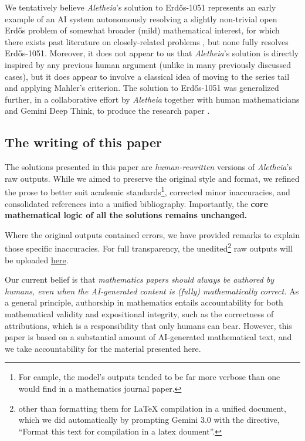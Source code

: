 \documentclass{article}
\theoremstyle{plain}
\theoremstyle{definition}
\newcommand{\Aletheia}{\emph{Aletheia}}
\begin{document}
We tentatively believe {\Aletheia}'s solution to Erd\H{o}s-1051 represents an early example of an AI system autonomously resolving a slightly non-trivial open Erd\H{o}s problem of somewhat broader (mild)  mathematical interest, for which there exists past literature on closely-related problems \cite{KolouchNovotny2016DiophantineApproximations}, but none fully resolves Erd\H{o}s-1051. Moreover, it does not appear to us that {\Aletheia}'s solution is directly inspired by any previous human argument (unlike in many previously discussed cases), but it does appear to involve a classical idea of moving to the series tail and applying Mahler's criterion. The solution to Erd\H{o}s-1051 was generalized further, in a collaborative effort by {\Aletheia} together with human mathematicians and Gemini Deep Think, to produce the research paper \cite{BKKKZ}. 


\subsection{The writing of this paper} The solutions presented in this paper are \emph{human-rewritten} versions of \Aletheia’s raw outputs. While we aimed to preserve the original style and format, we refined the prose to better suit academic standards\footnote{For eample, the model's outputs tended to be far more verbose than one would find in a mathematics journal paper.}, corrected minor inaccuracies, and consolidated references into a unified bibliography. Importantly, the \textbf{core mathematical logic of all the solutions remains unchanged.} 

Where the original outputs contained errors, we have provided remarks to explain those specific inaccuracies. For full transparency, the unedited\footnote{other than formatting them for {\LaTeX} compilation in a unified document, which we did automatically by prompting Gemini 3.0 with the directive, ``Format this text for compilation in a latex doument''.} raw outputs will be uploaded {\color{blue}\href{https://github.com/google-deepmind/superhuman/tree/main/aletheia}{here}}.

Our current belief is that \emph{mathematics papers should always be authored by humans, even when the AI-generated content is (fully) mathematically correct.} As a general principle, authorship in mathematics entails accountability for both mathematical validity and expositional integrity, such as the correctness of attributions, which is a responsibility that only humans can bear. However, this paper is based on a substantial amount of AI-generated mathematical text, and we take accountability for the material presented here. 
\end{document}
